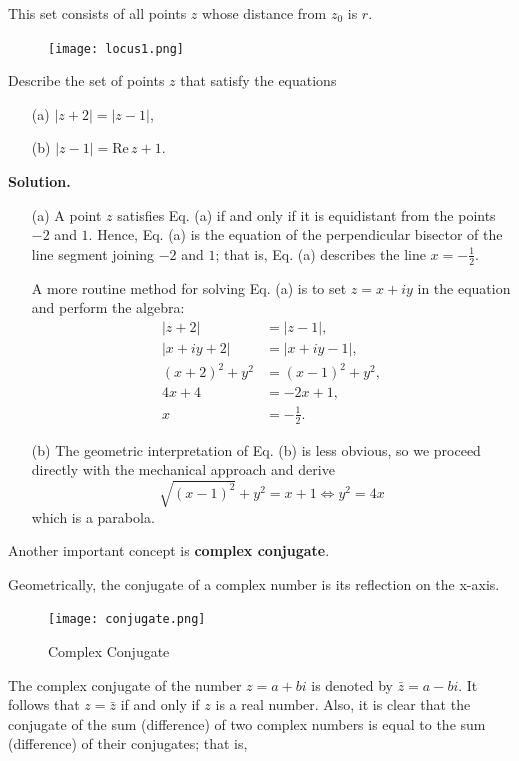\documentclass[
	12pt, %
	fleqn, %
	a4paper, %
]{LegrandOrangeBook}
\begin{document}
This set consists of all points $z$ whose distance from $z_0$ is $r$.
\begin{figure}[H]
    \centering
    \texttt{[image: locus1.png]}
\end{figure}
\begin{example}
    Describe the set of points \( z \) that satisfy the equations

\begin{enumerate}
\item[(a)] \( |z + 2| = |z - 1| \),
\item[(b)] \( |z - 1| = \text{Re} \, z + 1 \).
\end{enumerate}
\end{example}
\textbf{Solution.}

\begin{itemize}
    \item[(a)] A point \( z \) satisfies Eq. (a) if and only if it is equidistant from the points \( -2 \) and \( 1 \). Hence, Eq. (a) is the equation of the perpendicular bisector of the line segment joining \( -2 \) and \( 1 \); that is, Eq. (a) describes the line \( x = -\frac{1}{2} \).

    A more routine method for solving Eq. (a) is to set \( z = x + iy \) in the equation and perform the algebra:
    \begin{align*}
        |z + 2| &= |z - 1|, \\
        |x + iy + 2| &= |x + iy - 1|, \\
        (x + 2)^2 + y^2 &= (x - 1)^2 + y^2, \\
        4x + 4 &= -2x + 1, \\
        x &= -\frac{1}{2}.
    \end{align*}

    \item[(b)] The geometric interpretation of Eq. (b) is less obvious, so we proceed directly with the mechanical approach and derive
    $$\sqrt{(x-1)^2} + y^2 = x+1 \iff y^2 = 4x$$
    which is a parabola.
\end{itemize}
Another important concept is \textbf{complex conjugate}.

Geometrically, the conjugate of a complex number is its reflection on the x-axis.
\begin{figure}
    \centering
    \texttt{[image: conjugate.png]}
    \caption{Complex Conjugate}
  \end{figure}
  The complex conjugate of the number $z = a+bi$ is denoted by $\bar{z} = a-bi $.
  It follows that \( z = \bar{z} \) if and only if \( z \) is a real number. Also, it is clear that the conjugate of the sum (difference) of two complex numbers is equal to the sum (difference) of their conjugates; that is,
\end{document}
